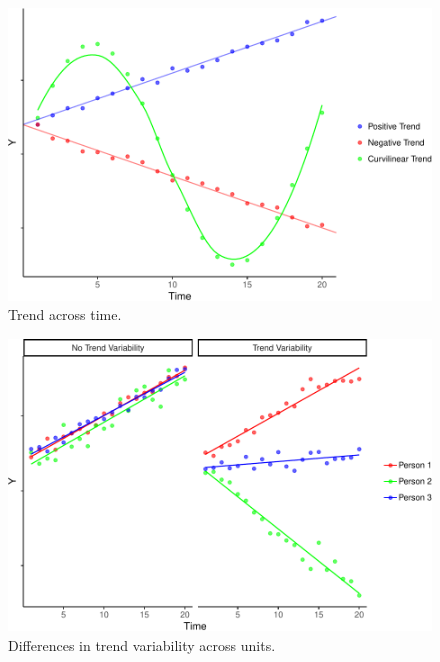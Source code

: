 \documentclass[english,,man]{apa6}
\theoremstyle{definition}
\theoremstyle{definition}
\theoremstyle{definition}
\theoremstyle{remark}
\begin{document}
\begin{figure}
\centering
\includegraphics{figures/unnamed-chunk-12-1.pdf}
\caption{\label{fig:unnamed-chunk-12}Trend across time.\label{trend}}
\end{figure}

\begin{figure}
\centering
\includegraphics{figures/unnamed-chunk-13-1.pdf}
\caption{\label{fig:unnamed-chunk-13}Differences in trend variability across
units.\label{trend_var}}
\end{figure}
\end{document}
